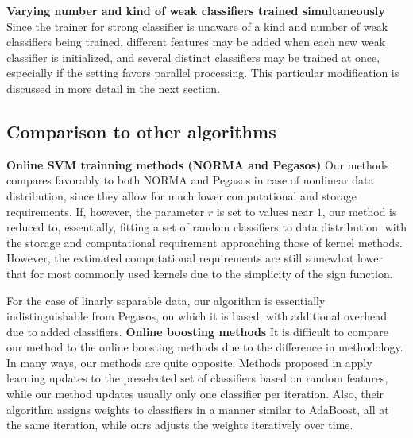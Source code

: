 {\bf Varying number and kind of weak classifiers trained simultaneously}  Since the trainer for strong classifier is unaware of a kind and number of weak classifiers being trained, different features may be added when each new weak classifier is initialized, and several distinct classifiers may be trained at once, especially if the setting favors parallel processing. 
This particular modification  is discussed in more detail in the next section.


\subsection{Comparison to other algorithms}
{\bf Online SVM trainning methods (NORMA and Pegasos)}
Our methods compares favorably to both NORMA and Pegasos in case of nonlinear data distribution, since they allow for much lower computational and storage requirements. If, however, the parameter $r$ is set to values near $1$, our method is reduced to, essentially, fitting a set of random classifiers to data distribution, with the storage and computational requirement approaching those of kernel methods. However, the extimated computational requirements are still somewhat lower that for most commonly used kernels due to the simplicity of the sign function. 

For the case of linarly separable data, our algorithm is essentially indistinguishable from Pegasos, on which it is based, with additional overhead due to added classifiers.
{\bf Online boosting methods}
It is difficult to compare our method to the online boosting methods due to the difference in methodology. In many ways, our methods are quite opposite. Methods proposed in \cite{OnlineBoost} apply learning updates to the preselected set of classifiers based on random features, while our method updates usually only one classifier per iteration. Also, their algorithm assigns weights to classifiers in a manner similar to AdaBoost, all at the same iteration, while ours adjusts the weights iteratively over time. 












